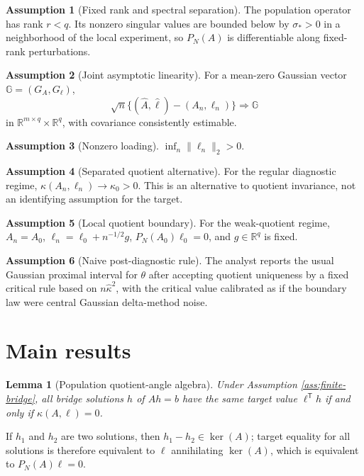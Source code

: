 \documentclass[11pt]{article}
\newcommand{\transpose}{\mathsf{T}}
\newcommand{\R}{\mathbb{R}}
\theoremstyle{definition}
\newtheorem{assumption}{Assumption}
\theoremstyle{plain}
\newtheorem{lemma}{Lemma}
\theoremstyle{remark}
\begin{document}
\begin{assumption}[Fixed rank and spectral separation]\label{ass:fixed-rank}
The population operator has rank \(r<q\). Its nonzero singular values are bounded below by \(\sigma_*>0\) in a neighborhood of the local experiment, so \(P_N(A)\) is differentiable along fixed-rank perturbations.
\end{assumption}

\begin{assumption}[Joint asymptotic linearity]\label{ass:joint-al}
For a mean-zero Gaussian vector \(\mathbb G=(G_A,G_\ell)\),
\[
        \sqrt n\{(\widehat A,\widehat\ell)-(A_n,\ell_n)\}\Rightarrow \mathbb G
\]
in \(\R^{m\times q}\times\R^q\), with covariance consistently estimable.
\end{assumption}

\begin{assumption}[Nonzero loading]\label{ass:nonzero-loading}
\(\inf_n \|\ell_n\|_2>0\).
\end{assumption}

\begin{assumption}[Separated quotient alternative]\label{ass:separated}
For the regular diagnostic regime, \(\kappa(A_n,\ell_n)\to\kappa_0>0\). This is an alternative to quotient invariance, not an identifying assumption for the target.
\end{assumption}

\begin{assumption}[Local quotient boundary]\label{ass:local-boundary}
For the weak-quotient regime, \(A_n=A_0\), \(\ell_n=\ell_0+n^{-1/2}g\), \(P_N(A_0)\ell_0=0\), and \(g\in\R^q\) is fixed.
\end{assumption}

\begin{assumption}[Naive post-diagnostic rule]\label{ass:naive-rule}
The analyst reports the usual Gaussian proximal interval for \(\theta\) after accepting quotient uniqueness by a fixed critical rule based on \(n\widehat\kappa^2\), with the critical value calibrated as if the boundary law were central Gaussian delta-method noise.
\end{assumption}

\section{Main results}
\begin{lemma}[Population quotient-angle algebra]\label{lem:population-angle}
Under Assumption \ref{ass:finite-bridge}, all bridge solutions \(h\) of \(Ah=b\) have the same target value \(\ell^\transpose h\) if and only if \(\kappa(A,\ell)=0\).
\end{lemma}
If \(h_1\) and \(h_2\) are two solutions, then \(h_1-h_2\in\ker(A)\); target equality for all solutions is therefore equivalent to \(\ell\) annihilating \(\ker(A)\), which is equivalent to \(P_N(A)\ell=0\).
\end{document}
